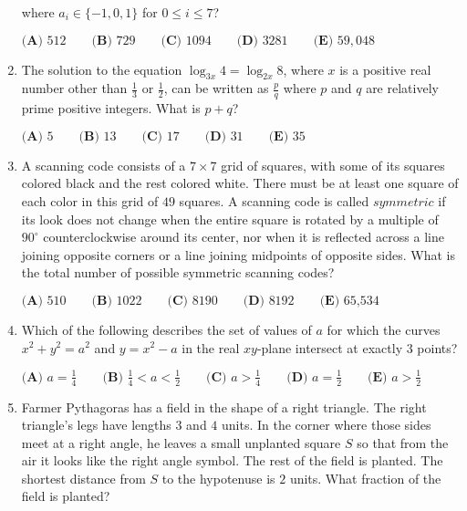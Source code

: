 \documentclass{article}
\begin{document}
\begin{enumerate}[label=\arabic*., itemsep=0.5em]
where \(a_i\in \{-1,0,1\}\) for \(0\le i \le 7\)?

\(\textbf{(A) } 512 \qquad 
\textbf{(B) } 729 \qquad 
\textbf{(C) } 1094 \qquad 
\textbf{(D) } 3281 \qquad 
\textbf{(E) } 59,048 \)\par \vspace{0.5em}\item The solution to the equation \(\log_{3x} 4 = \log_{2x} 8\), where \(x\) is a positive real number other than \(\frac{1}{3}\) or \(\frac{1}{2}\), can be written as \(\frac {p}{q}\) where \(p\) and \(q\) are relatively prime positive integers. What is \(p + q\)?

\(\textbf{(A) } 5   \qquad    
\textbf{(B) } 13   \qquad    
\textbf{(C) } 17   \qquad   
\textbf{(D) } 31 \qquad  
\textbf{(E) } 35 \)\par \vspace{0.5em}\item A scanning code consists of a \(7 \times 7\) grid of squares, with some of its squares colored black and the rest colored white. There must be at least one square of each color in this grid of \(49\) squares. A scanning code is called \(\textit{symmetric}\) if its look does not change when the entire square is rotated by a multiple of \(90 ^{\circ}\) counterclockwise around its center, nor when it is reflected across a line joining opposite corners or a line joining midpoints of opposite sides. What is the total number of possible symmetric scanning codes?

\(\textbf{(A)} \text{ 510} \qquad \textbf{(B)} \text{ 1022} \qquad \textbf{(C)} \text{ 8190} \qquad \textbf{(D)} \text{ 8192} \qquad \textbf{(E)} \text{ 65,534}\)\par \vspace{0.5em}\item Which of the following describes the set of values of \(a\) for which the curves \(x^2+y^2=a^2\) and \(y=x^2-a\) in the real \(xy\)-plane intersect at exactly \(3\) points?

\(
\textbf{(A) }a=\frac14 \qquad
\textbf{(B) }\frac14 < a < \frac12 \qquad
\textbf{(C) }a>\frac14 \qquad
\textbf{(D) }a=\frac12 \qquad
\textbf{(E) }a>\frac12 \qquad
\)\par \vspace{0.5em}\item Farmer Pythagoras has a field in the shape of a right triangle. The right triangle's legs have lengths \(3\) and \(4\) units. In the corner where those sides meet at a right angle, he leaves a small unplanted square \(S\) so that from the air it looks like the right angle symbol. The rest of the field is planted. The shortest distance from \(S\) to the hypotenuse is \(2\) units. What fraction of the field is planted?



\end{enumerate}
\end{document}
